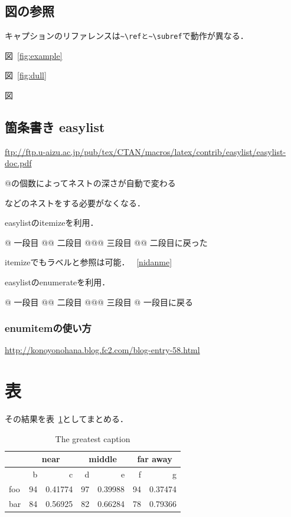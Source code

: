 \documentclass[a4paper,10pt]{ltjsarticle}
\begin{document}
    \subsection{図の参照}
    キャプションのリファレンスは\verb|~\refと~\subref|で動作が異なる．

    図~\ref{fig:example}

    図~\ref{fig:dull}

    図~

    \subsection{箇条書き easylist}

    \url{ftp://ftp.u-aizu.ac.jp/pub/tex/CTAN/macros/latex/contrib/easylist/easylist-doc.pdf}


    @の個数によってネストの深さが自動で変わる
    \begin{verb}
    \begin{enumerate}
    \end{verb}
    などのネストをする必要がなくなる．

    easylistのitemizeを利用．
    \begin{easylist}[itemize]
        @ 一段目
        @@ 二段目 \label{nidanme}
        @@@ 三段目
        @@ 二段目に戻った
    \end{easylist}

    itemizeでもラベルと参照は可能．
    ~\ref{nidanme}

    easylistのenumerateを利用．

    \begin{easylist}[enumerate]
        @ 一段目
        @@ 二段目
        @@@ 三段目
        @ 一段目に戻る
    \end{easylist}

    \subsubsection{enumitemの使い方}
    \url{http://konoyonohana.blog.fc2.com/blog-entry-58.html}

    \section{表}
    その結果を表~\ref{tab:foobar}としてまとめる．

    \begin{table}[t]
        \centering
        \caption{The greatest caption}
        \begin{tabular}{l|rr|rr|rr}
            &\multicolumn{2}{c|}{near} &\multicolumn{2}{c|}{middle} &\multicolumn{2}{c}{ far away}\\
            \hline
            &b&c&d&e&f&g\\
            \hline
            foo &94 &0.41774&97&0.39988&94&0.37474\\
            bar& 84& 0.56925&82&0.66284&78&0.79366 \\
        \end{tabular}
        \label{tab:foobar}
    \end{table}
\end{document}
